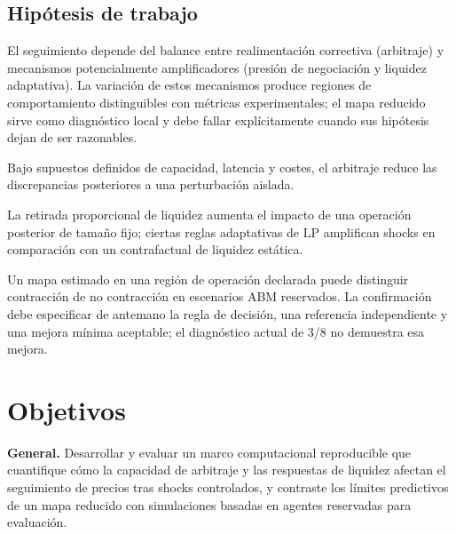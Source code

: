 \subsection{Hipótesis de trabajo}

El seguimiento depende del balance entre realimentación correctiva (arbitraje) y
mecanismos potencialmente amplificadores (presión de negociación y liquidez
adaptativa). La variación de estos mecanismos produce regiones de comportamiento
distinguibles con métricas experimentales; el mapa reducido sirve como diagnóstico
local y debe fallar explícitamente cuando sus hipótesis dejan de ser razonables.

\begin{description}[style=nextline]
  \item[H1a.] Bajo supuestos definidos de capacidad, latencia y costes, el arbitraje
    reduce las discrepancias posteriores a una perturbación aislada.
  \item[H1b.] La retirada proporcional de liquidez aumenta el impacto de una operación
    posterior de tamaño fijo; ciertas reglas adaptativas de LP amplifican shocks en
    comparación con un contrafactual de liquidez estática.
  \item[H1c.] Un mapa estimado en una región de operación declarada puede distinguir
    contracción de no contracción en escenarios ABM reservados. La confirmación debe
    especificar de antemano la regla de decisión, una referencia independiente y una
    mejora mínima aceptable; el diagnóstico actual de 3/8 no demuestra esa mejora.
\end{description}

\section{Objetivos}

\textbf{General.} Desarrollar y evaluar un marco computacional reproducible que cuantifique cómo la
capacidad de arbitraje y las respuestas de liquidez afectan el seguimiento de precios
tras shocks controlados, y contraste los límites predictivos de un mapa reducido con
simulaciones basadas en agentes reservadas para evaluación.

